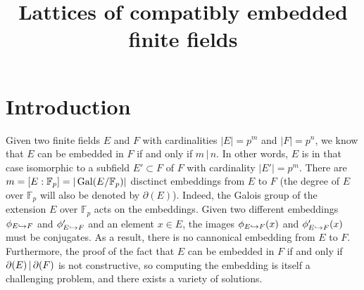 \documentclass[11pt]{article}
\title{Lattices of compatibly embedded finite fields}
\author{}
\begin{document}
\maketitle
\begin{center}
  

\end{center}

\section{Introduction}

Given two finite fields $E$ and $F$ with cardinalities $|E|=p^{m}$ and
$|F|=p^{n}$, we know that $E$ can be embedded in $F$ if and only if $m\,|\,n$.
In other words, $E$ is in that case isomorphic to a subfield $E'\subset F$ of $F$ with
cardinality $|E'|=p^{m}$. There are
$m=[E:\mathbb{F}_p]=|\operatorname{Gal}(E/\mathbb{F}_p)|$ disctinct embeddings from $E$ to
$F$ (the degree of $E$ over $\mathbb{F}_p$ will also be denoted by
$\partial(E)$). Indeed, the Galois group of the extension $E$ over $\mathbb{F}_p$ acts
on the embeddings. Given two different embeddings $\phi_{E\hookrightarrow F}$ and
$\phi_{E\hookrightarrow F}'$ and an element $x\in E$, the images $\phi_{E\hookrightarrow F}(x)$ and
$\phi_{E\hookrightarrow F}'(x)$ must be conjugates. As a result, there is no cannonical
embedding from $E$ to $F$. Furthermore, the proof of the fact that $E$ can be
embedded in $F$ if and only if $\partial(E)\,|\,\partial(F)$ is not constructive, so computing the
embedding is itself a challenging problem, and there exists a variety of
solutions.
\end{document}
